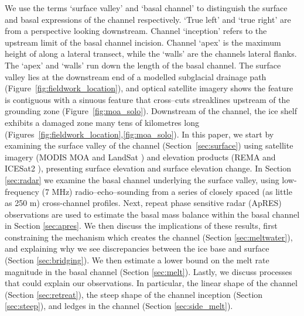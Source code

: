 We use the terms `surface valley' and `basal channel' to distinguish the surface and basal expressions of the channel respectively. `True left' and `true right' are from a perspective looking downstream. Channel `inception' refers to the upstream limit of the basal channel incision. Channel `apex' is the maximum height of along a lateral transect, while the `walls' are the channels lateral flanks. The `apex' and `walls' run down the length of the basal channel.  The surface valley lies at the downstream end of a modelled subglacial drainage path (Figure~\ref{fig:fieldwork_location}), and optical satellite imagery shows the feature is contiguous with a sinuous feature that cross--cuts streaklines upstream of the grounding zone (Figure~\ref{fig:moa_solo}). Downstream of the channel, the ice shelf exhibits a damaged zone many tens of kilometres long (Figures~\ref{fig:fieldwork_location},\ref{fig:moa_solo}).
In this paper, we start by examining the surface valley of the channel (Section~\ref{sec:surface}) using satellite imagery (MODIS MOA \cite{haran2014modis} and LandSat \cite{RoyLandsat8Scienceproduct2014}) and elevation products (REMA \cite{howat2019reference} and ICESat2 \cite{smith2021v3}), presenting surface elevation and surface elevation change. 
In Section \ref{sec:radar} we examine the basal channel underlying the surface valley, using low-frequency (7 MHz) radio--echo--sounding from a series of closely spaced (as little as 250 m) cross-channel profiles. Next, repeat phase sensitive radar (ApRES) observations are used to estimate the basal mass balance within the basal channel in Section \ref{sec:apres}.
We then discuss the implications of these results, first constraining the mechanism which creates the channel (Section \ref{sec:meltwater}), and explaining why we see discrepancies between the ice base and surface (Section \ref{sec:bridging}). We then estimate a lower bound on the melt rate magnitude in the basal channel (Section \ref{sec:melt}). 
Lastly, we discuss processes that could explain our observations. In particular, the linear shape of the channel (Section \ref{sec:retreat}), the steep shape of the channel inception (Section \ref{sec:steep}), and ledges in the channel (Section \ref{sec:side_melt}).



